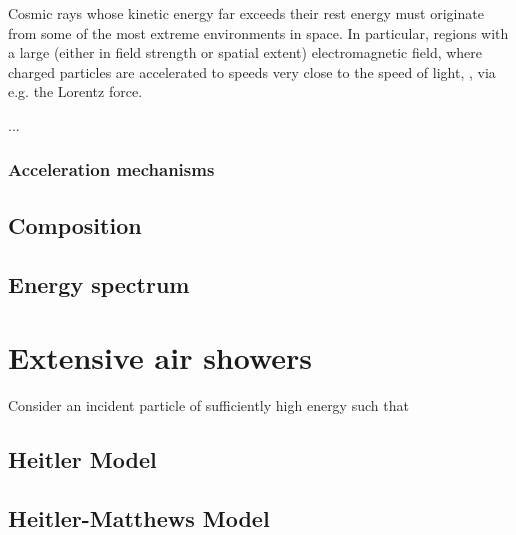 Cosmic rays whose kinetic energy far exceeds their rest energy must originate from some of the most extreme environments in space. In particular,
regions with a large (either in field strength or spatial extent) electromagnetic field, where charged particles are accelerated to speeds very
close to the speed of light, \speedoflight, via e.g. the Lorentz force.

... \TODO

\subsubsection{Acceleration mechanisms}
\label{sssec:cr-acceleration-mechanisms}



\subsection{Composition}
\label{ssec:cr-composition}

\subsection{Energy spectrum}
\label{ssec:cr-energy-spectrum}


\section{Extensive air showers}
\label{sec:extensive-air-showers}

Consider an incident particle of sufficiently high energy such that 

\subsection{Heitler Model}
\label{ssec:heitler-model}

\subsection{Heitler-Matthews Model}
\label{ssec:heitler-matthews-model}








